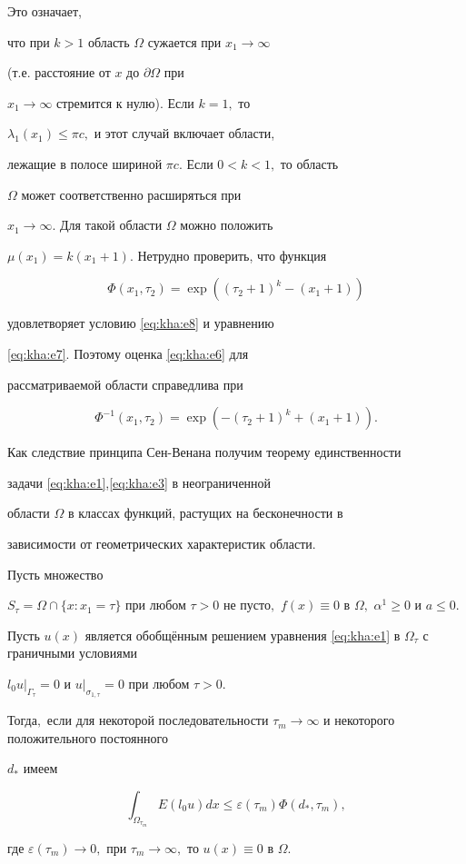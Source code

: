 Это означает,

что при $k>1$ область $\Omega$ сужается при $x_1\to \infty$

(т.е. расстояние от $x$ до $\partial\Omega$ при

$x_1\to \infty$ стремится к нулю). Если $k=1,$ то

$\lambda_1(x_1)\leqslant\pi c,$ и этот случай включает области,

лежащие в полосе шириной $\pi c.$ Если \mbox{$0<k<1,$} то область

$\Omega$ может соответственно расширяться при

$x_1\to \infty.$ Для такой области  $\Omega$ можно положить

$\mu(x_1)=k(x_1+1).$ Нетрудно проверить, что функция

$$

\Phi(x_1,\tau_2)=\exp\left((\tau_2+1)^k-(x_1+1)\right)

$$

удовлетворяет условию \eqref{eq:kha:e8} и уравнению

\eqref{eq:kha:e7}. Поэтому оценка \eqref{eq:kha:e6} для

рассматриваемой области справедлива при

$$

\Phi^{-1}(x_1,\tau_2)=\exp\left(-(\tau_2+1)^k+(x_1+1)\right).

$$



Как следствие принципа Сен-Венана получим теорему единственности

задачи \eqref{eq:kha:e1},\eqref{eq:kha:e3} в неограниченной

области $\Omega$ в классах функций, растущих на бесконечности в

зависимости от геометрических характеристик области.



\smallskip

\begin{theorem}[2]Пусть множество

$S_\tau=\Omega\cap\{x:x_1=\tau\}$ при любом $\tau>0$ не пусто$,$  $f(x)\equiv0$ в $\Omega,$ $\alpha^1\geq0$ и $a\leq0.$

Пусть $u(x)$ является обобщённым решением уравнения \eqref{eq:kha:e1} в $\Omega_\tau$ с граничными условиями

$l_0u\big|_{\Gamma_\tau}=0$ и $u\big|_{\sigma_{1,\tau}}=0$ при любом $\tau>0.$ 

Тогда$,$ если для некоторой последовательности $\tau_m\to \infty$  и некоторого положительного постоянного

$d_\ast$ имеем

\begin{equation}\label{eq:kha:e16}

\int _{\Omega_{\tau_m}}E(l_0u)dx\leqslant\varepsilon(\tau_m)\Phi(d_\ast,\tau_m),

\end{equation}

где $\varepsilon(\tau_m)\to  0,$ при $\tau_m\to \infty,$ то $u(x)\equiv 0$ в $\Omega.$

\end{theorem}



